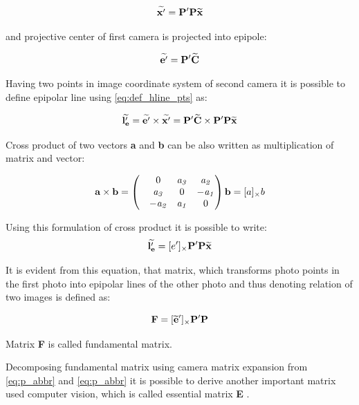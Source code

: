 \documentclass[a4paper,12pt]{report}
\newcommand{\ematr}[1]{
{\bf #1}
}
\newcommand{\evect}[1]{
{\bf #1}
}
\newcommand{\ehvect}[1]{
{\bf \widetilde{#1}}
}
\newcommand{\escal}[1]{
{\it #1}
}
\begin{document}
\begin{equation}
\ehvect{x'} =  \ematr{P'}\ematr{P}\ehvect{x}
\end{equation}

and projective center of first camera is projected into epipole: 

\begin{equation}
\ehvect{e'} =  \ematr{P'}\ehvect{C}
\end{equation}

Having two points in image coordinate system of second camera it is possible to define epipolar line using \eqref{eq:def_hline_pts} as:

\begin{equation}
\ehvect{l'_{e}} =  \ehvect{e'} \times \ehvect{x'} = \ematr{P'}\ehvect{C} \times \ematr{P'}\ematr{P}\ehvect{x}
\end{equation}

Cross product of two vectors \evect{a} and \evect{b} can be also written as multiplication of matrix and vector:

\begin{equation}
\evect{a}  \times \evect{b}  = 
\begin{pmatrix}
   & 0      & \escal{a_{3}}   & \escal{a_{2}}\\
   & \escal{a_{3}}  & 0               & \escal{-a_{1}}\\
   & \escal{-a_{2}} & \escal{a_{1}}   & 0\\
\end{pmatrix}
\evect{b} = [a]_{\times} b
\end{equation}

Using this formulation of cross product it is possible to write:
\begin{equation}
\ehvect{l'_{e}}  = [e']_{\times} \ematr{P'}\ematr{P}\ehvect{x}
\end{equation}

It is evident from this equation, that matrix, which transforms photo points in the first photo into 
epipolar lines of the other photo and thus denoting relation of two images is defined as:

\begin{equation}
\ematr{F}  = [\ehvect{e}']_{\times} \ematr{P'}\ematr{P}
\end{equation}

Matrix \ematr{F} is called fundamental matrix. 

Decomposing fundamental matrix using camera matrix expansion from \eqref{eq:p_abbr} and \eqref{eq:p_abbr}
it is possible to derive another important matrix used computer vision, which is called essential matrix \ematr{E}.
\end{document}
